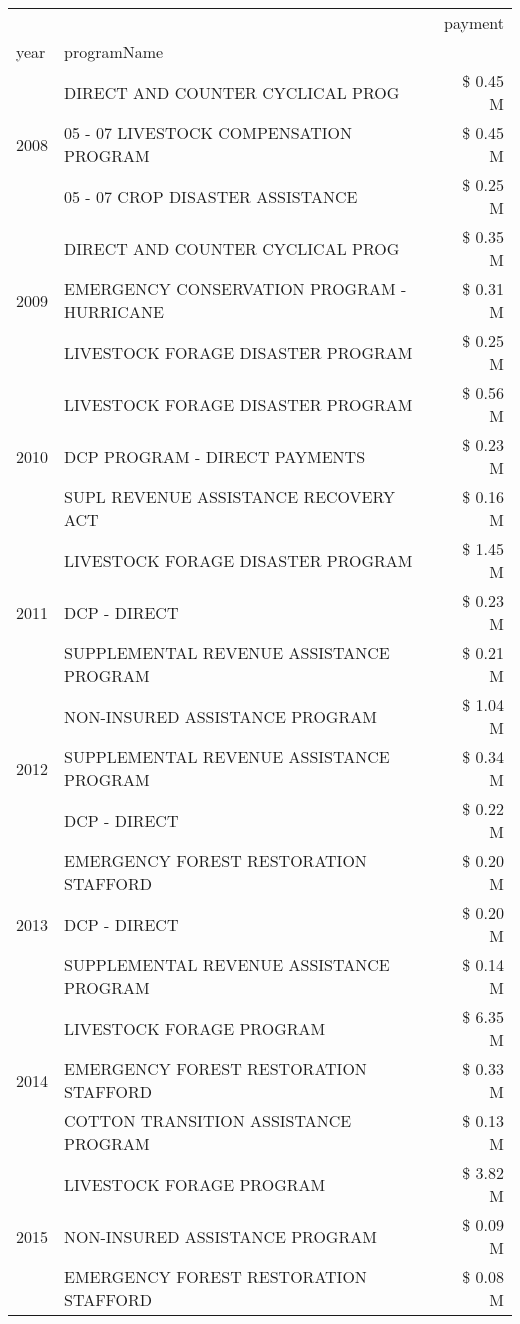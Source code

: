 \begin{tabular}{llr}
\toprule
 &  & payment \\
year & programName &  \\
\midrule
\multirow[t]{3}{*}{2008} & DIRECT AND COUNTER CYCLICAL PROG & \$ 0.45 M \\
 & 05 - 07 LIVESTOCK COMPENSATION PROGRAM & \$ 0.45 M \\
 & 05 - 07 CROP DISASTER ASSISTANCE & \$ 0.25 M \\
\cline{1-3}
\multirow[t]{3}{*}{2009} & DIRECT AND COUNTER CYCLICAL PROG & \$ 0.35 M \\
 & EMERGENCY CONSERVATION PROGRAM - HURRICANE & \$ 0.31 M \\
 & LIVESTOCK FORAGE DISASTER  PROGRAM & \$ 0.25 M \\
\cline{1-3}
\multirow[t]{3}{*}{2010} & LIVESTOCK FORAGE DISASTER  PROGRAM & \$ 0.56 M \\
 & DCP PROGRAM - DIRECT PAYMENTS & \$ 0.23 M \\
 & SUPL REVENUE ASSISTANCE RECOVERY ACT & \$ 0.16 M \\
\cline{1-3}
\multirow[t]{3}{*}{2011} & LIVESTOCK FORAGE DISASTER PROGRAM & \$ 1.45 M \\
 & DCP - DIRECT & \$ 0.23 M \\
 & SUPPLEMENTAL REVENUE ASSISTANCE PROGRAM & \$ 0.21 M \\
\cline{1-3}
\multirow[t]{3}{*}{2012} & NON-INSURED ASSISTANCE PROGRAM & \$ 1.04 M \\
 & SUPPLEMENTAL REVENUE ASSISTANCE PROGRAM & \$ 0.34 M \\
 & DCP - DIRECT & \$ 0.22 M \\
\cline{1-3}
\multirow[t]{3}{*}{2013} & EMERGENCY FOREST RESTORATION STAFFORD & \$ 0.20 M \\
 & DCP - DIRECT & \$ 0.20 M \\
 & SUPPLEMENTAL REVENUE ASSISTANCE PROGRAM & \$ 0.14 M \\
\cline{1-3}
\multirow[t]{3}{*}{2014} & LIVESTOCK FORAGE PROGRAM & \$ 6.35 M \\
 & EMERGENCY FOREST RESTORATION STAFFORD & \$ 0.33 M \\
 & COTTON TRANSITION ASSISTANCE PROGRAM & \$ 0.13 M \\
\cline{1-3}
\multirow[t]{3}{*}{2015} & LIVESTOCK FORAGE PROGRAM & \$ 3.82 M \\
 & NON-INSURED ASSISTANCE PROGRAM & \$ 0.09 M \\
 & EMERGENCY FOREST RESTORATION STAFFORD & \$ 0.08 M \\

\end{tabular}
